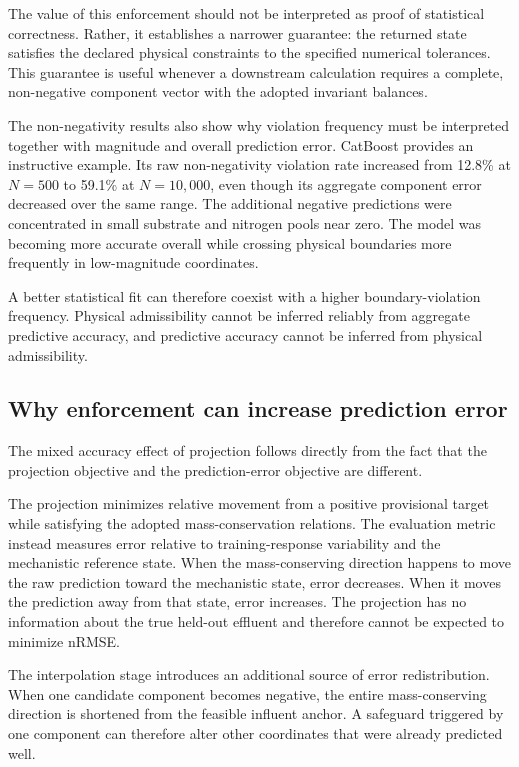 The value of this enforcement should not be interpreted as proof of statistical correctness. Rather, it establishes a narrower guarantee: the returned state satisfies the declared physical constraints to the specified numerical tolerances. This guarantee is useful whenever a downstream calculation requires a complete, non-negative component vector with the adopted invariant balances.

The non-negativity results also show why violation frequency must be interpreted together with magnitude and overall prediction error. CatBoost provides an instructive example. Its raw non-negativity violation rate increased from 12.8\% at $N=500$ to 59.1\% at $N=10{,}000$, even though its aggregate component error decreased over the same range. The additional negative predictions were concentrated in small substrate and nitrogen pools near zero. The model was becoming more accurate overall while crossing physical boundaries more frequently in low-magnitude coordinates.

A better statistical fit can therefore coexist with a higher boundary-violation frequency. Physical admissibility cannot be inferred reliably from aggregate predictive accuracy, and predictive accuracy cannot be inferred from physical admissibility.

\subsection{Why enforcement can increase prediction error}

The mixed accuracy effect of projection follows directly from the fact that the projection objective and the prediction-error objective are different.

The projection minimizes relative movement from a positive provisional target while satisfying the adopted mass-conservation relations. The evaluation metric instead measures error relative to training-response variability and the mechanistic reference state. When the mass-conserving direction happens to move the raw prediction toward the mechanistic state, error decreases. When it moves the prediction away from that state, error increases. The projection has no information about the true held-out effluent and therefore cannot be expected to minimize nRMSE.

The interpolation stage introduces an additional source of error redistribution. When one candidate component becomes negative, the entire mass-conserving direction is shortened from the feasible influent anchor. A safeguard triggered by one component can therefore alter other coordinates that were already predicted well.

